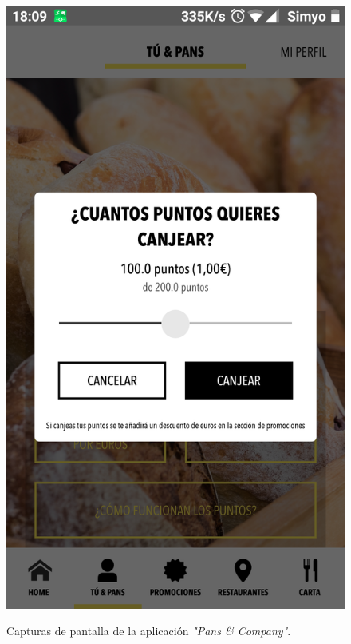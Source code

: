 \documentclass[twoside]{report}
\begin{document}
\begin{figure}[H]
\begin{center}
\includegraphics[scale=0.25]{images/restaurantes/pans2.png}
\caption{Capturas de pantalla de la aplicación \textit{"Pans \& Company"}.} \cite{pansapp}
\end{center}
\end{figure}
\end{document}
